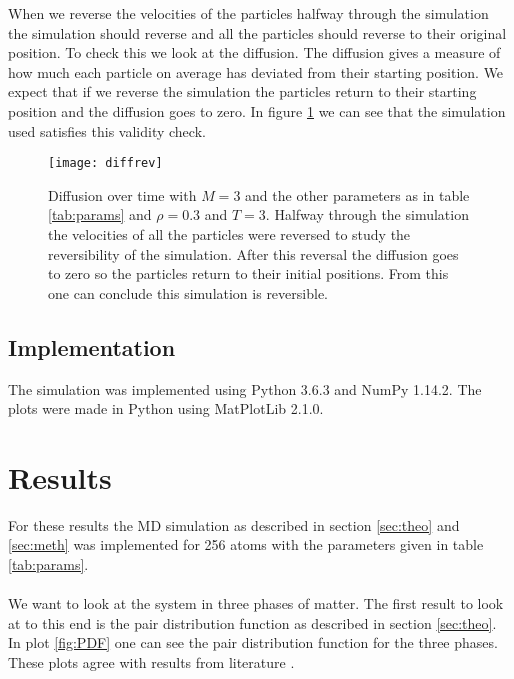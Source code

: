 \documentclass[10 pt, a4paper]{article}
\begin{document}
When we reverse the velocities of the particles halfway through the simulation the simulation should reverse and all the particles should reverse to their original position. To check this we look at the diffusion. The diffusion gives a measure of how much each particle on average has deviated from their starting position. We expect that if we reverse the simulation the particles return to their starting position and the diffusion goes to zero. In figure \ref{fig:diffrev} we can see that the simulation used satisfies this validity check.

\begin{figure}[H]
\centering
\texttt{[image: diffrev]}
\caption{Diffusion over time with $M = 3$ and the other parameters as in table \ref{tab:params} and $\rho = 0.3$ and $T = 3$. Halfway through the simulation the velocities of all the particles were reversed to study the reversibility of the simulation. After this reversal the diffusion goes to zero so the particles return to their initial positions. From this one can conclude this simulation is reversible.}
\label{fig:diffrev}
\end{figure}

\subsection{Implementation}

The simulation was implemented using Python 3.6.3 and NumPy 1.14.2. The plots were made in Python using MatPlotLib 2.1.0.

\section{Results} \label{sec:results}

For these results the MD simulation as described in section \ref{sec:theo} and \ref{sec:meth} was implemented for 256 atoms with the parameters given in table \ref{tab:params}. 
\\
\\
We want to look at the system in three phases of matter. The first result to look at to this end is the pair distribution function as described in section \ref{sec:theo}. In plot \ref{fig:PDF} one can see the pair distribution function for the three phases. These plots agree with results from literature \cite{pdf}. 
\end{document}
